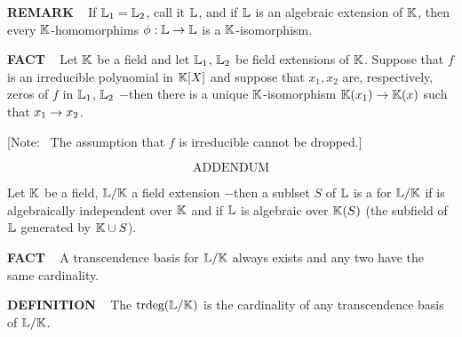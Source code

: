 \vspace{0.1cm}

\begin{x}{\small\bf REMARK} \ %
If $\mathbb{L}_1 = \mathbb{L}_2$, call it $\mathbb{L}$, and if $\mathbb{L}$ is an algebraic extension of $\mathbb{K}$, then every $\mathbb{K}$-homomorphims 
$\phi:\mathbb{L} \rightarrow \mathbb{L}$ is a $\mathbb{K}$-isomorphism.
\end{x}

\vspace{0.1cm}

\begin{x}{\small\bf FACT} \ %
Let $\mathbb{K}$ be a field and let $\mathbb{L}_1$, $\mathbb{L}_2$ be field extensions of $\mathbb{K}$.  Suppose that $f$ is an irreducible polynomial in 
$\mathbb{K}[X]$ and suppose that $x_1, x_2$ are, respectively, zeros of $f$ in  $\mathbb{L}_1$, $\mathbb{L}_2$  $-$then 
there is a unique $\mathbb{K}$-isomorphism 
$\mathbb{K}(x_1) \rightarrow \mathbb{K}(x)$ such that $x_1 \rightarrow x_2$.
\end{x}

\vspace{0.1cm}

[Note: \ The assumption that $f$ is irreducible cannot be dropped.]

\vspace{0.3cm}

\setcounter{theoremn}{0}
\[
\text{ADDENDUM}
\]

Let $\mathbb{K}$ be a field, $\mathbb{L}/\mathbb{K}$ a field extension $-$then a sublset $S$ of $\mathbb{L}$ is a 
for $\mathbb{L}/\mathbb{K}$ if \mS is algebraically independent over $\mathbb{K}$ and if $\mathbb{L}$ is algebraic over $\mathbb{K}(S)$ 
(the subfield of $\mathbb{L}$ generated by $\mathbb{K} \cup S$).

\begin{x}{\small\bf FACT} \ %
A transcendence basis for $\mathbb{L}/\mathbb{K}$ always exists and any two have the same cardinality.
\end{x}

\vspace{0.1cm}

\begin{x}{\small\bf DEFINITION} \ %
The 
$\trdeg(\LL/\K)$
\index{$\trdeg(\LL/\K)$} 
is the cardinality of any transcendence basis of $\mathbb{L}/\mathbb{K}$.
\end{x}

\vspace{0.1cm}


